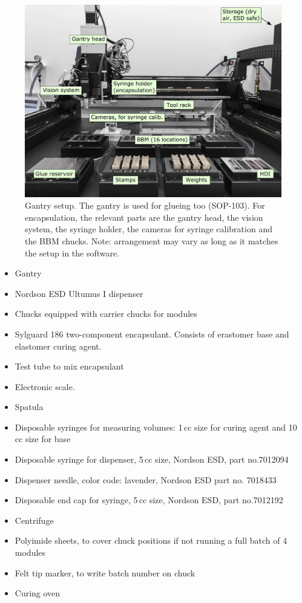 \documentclass[12pt]{unlsilabsop}
\begin{document}
\begin{figure}[h]
    \begin{center}
        \includegraphics[width=\textwidth]{img/gantryFull16labeled.jpg}
        \caption{Gantry setup. The gantry is used for glueing too (SOP-103). For encapsulation, the relevant parts are the gantry head, the vision system, the syringe holder, the cameras for syringe calibration and the BBM chucks. Note: arrangement may vary as long as it matches the setup in the software.}
        \label{fig:gantryFullLabeled}
    \end{center}
\end{figure}

\begin{itemize}
    \item Gantry
    \item Nordson ESD Ultumus I dispenser
    \item Chucks equipped with carrier chucks for modules
    \item Sylguard 186 two-component encapsulant. Consists of erastomer base and elastomer curing agent.
    \item Test tube to mix encapsulant
    \item Electronic scale.
    \item Spatula
    \item Disposable syringes for measuring volumes: 1\,cc size for curing agent and 10\,cc size for base
    \item Disposable syringe for dispenser, 5\,cc size, Nordson ESD, part no.7012094
    \item Dispenser needle, color code: lavender, Nordson ESD part no. 7018433
    \item Disposable end cap for syringe, 5\,cc size, Nordson ESD, part no.7012192
    \item Centrifuge
    \item Polyimide sheets, to cover chuck positions if not running a full batch of 4 modules
    \item Felt tip marker, to write batch number on chuck
    \item Curing oven
\end{itemize}
\end{document}
